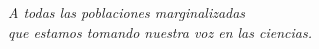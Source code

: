 \begin{flushright}
    \null{}
    \emph{A todas las poblaciones marginalizadas\\que estamos tomando nuestra voz en las ciencias.}
    \null
\end{flushright}
\newpage
